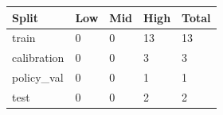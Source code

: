 \begin{tabular}{lllll}
\toprule
Split & Low & Mid & High & Total \\
\midrule
train & 0 & 0 & 13 & 13 \\
calibration & 0 & 0 & 3 & 3 \\
policy\_val & 0 & 0 & 1 & 1 \\
test & 0 & 0 & 2 & 2 \\
\bottomrule
\end{tabular}